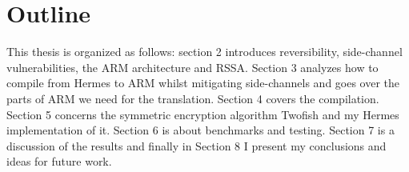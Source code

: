 \section{Outline}
This thesis is organized as follows: section 2 introduces reversibility, side-channel vulnerabilities, the ARM architecture and RSSA. Section 3 analyzes how to compile from Hermes to ARM whilst mitigating side-channels and goes over the parts of ARM we need for the translation. Section 4 covers the compilation. Section 5 concerns the symmetric encryption algorithm Twofish and my Hermes implementation of it. Section 6 is about benchmarks and testing. Section 7 is a discussion of the results and finally in Section 8 I present my conclusions and ideas for future work.
